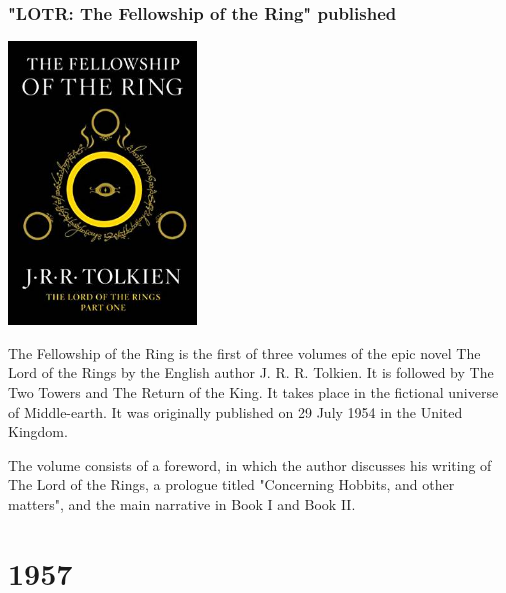 \documentclass[11pt]{report}
\begin{document}
\subsection{"LOTR: The Fellowship of the Ring" published}
\vspace{2mm}\begin{center}\includegraphics[width=5cm]{./img/lotrbook1.jpg}\end{center}
The Fellowship of the Ring is the first of three volumes of the epic novel The Lord of the Rings by the English author J. R. R. Tolkien. It is followed by The Two Towers and The Return of the King. It takes place in the fictional universe of Middle-earth. It was originally published on 29 July 1954 in the United Kingdom.

The volume consists of a foreword, in which the author discusses his writing of The Lord of the Rings, a prologue titled "Concerning Hobbits, and other matters", and the main narrative in Book I and Book II.

\chapter{1957}
\end{document}
